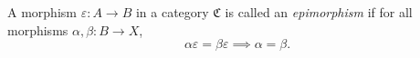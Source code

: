 A morphism $\varepsilon : A \to B$ in a category $\mathfrak{C}$ is called an \textit{epimorphism} if for all morphisms $\alpha, \beta : B \to X$,
$$
\alpha \varepsilon = \beta \varepsilon \implies \alpha = \beta.
$$
